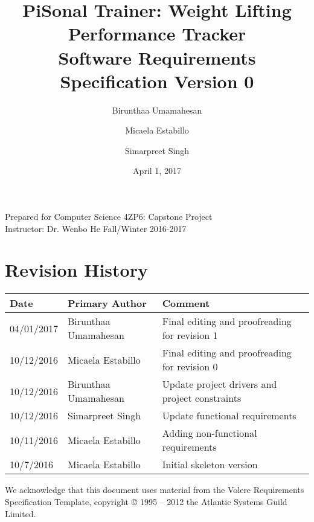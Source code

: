 \documentclass{article}
\title{
PiSonal Trainer: Weight Lifting Performance Tracker\\
\Large {Software Requirements Specification Version 0}
}
\date{April 1, 2017}
\author{Birunthaa Umamahesan \and Micaela Estabillo \and Simarpreet Singh}
\begin{document}
\thispagestyle{plain}
\maketitle
\vfill
\begin{center}
    Prepared for Computer Science 4ZP6: Capstone Project \\
    Instructor: Dr. Wenbo He
    Fall/Winter 2016-2017\\
\end{center}
\newpage

\tableofcontents

\listoffigures

\listoftables

\thispagestyle{plain}

\newpage

\section*{Revision History}
\begingroup
\begin{tabular}{ | p{2cm} |  p{3.8cm} | p{7cm} |} 
    \hline
    \textbf{Date} & \textbf{Primary Author} & \textbf{Comment}\\
    \hline
    04/01/2017 & Birunthaa Umamahesan & Final editing and proofreading for revision 1\\ 
    \hline
    10/12/2016 & Micaela Estabillo & Final editing and proofreading for revision 0\\ 
    \hline
    10/12/2016 & Birunthaa Umamahesan & Update project drivers and project constraints \\
    \hline
    10/12/2016 & Simarpreet Singh & Update functional requirements\\ 
    \hline
    10/11/2016 & Micaela Estabillo & Adding non-functional requirements\\
    \hline
    10/7/2016 & Micaela Estabillo & Initial skeleton version\\
    \hline
\end{tabular}
\endgroup


\begin{center}
We acknowledge that this document uses material from the Volere Requirements Specification Template, copyright © 1995 – 2012 the Atlantic Systems Guild Limited.
\end{center}
\end{document}
